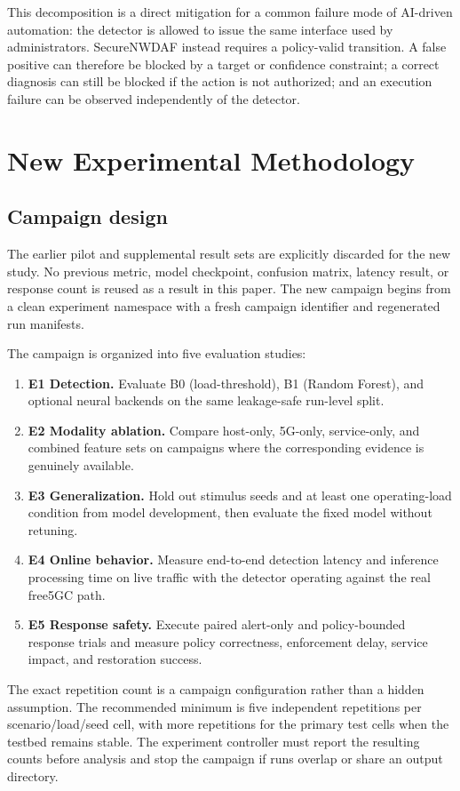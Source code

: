 \documentclass[sigconf,review]{acmart}
\begin{document}
This decomposition is a direct mitigation for a common failure mode of AI-driven automation: the detector is allowed to issue the same interface used by administrators. SecureNWDAF instead requires a policy-valid transition. A false positive can therefore be blocked by a target or confidence constraint; a correct diagnosis can still be blocked if the action is not authorized; and an execution failure can be observed independently of the detector.

\section{New Experimental Methodology}
\subsection{Campaign design}
The earlier pilot and supplemental result sets are explicitly discarded for the new study. No previous metric, model checkpoint, confusion matrix, latency result, or response count is reused as a result in this paper. The new campaign begins from a clean experiment namespace with a fresh campaign identifier and regenerated run manifests.

The campaign is organized into five evaluation studies:
\begin{enumerate}[leftmargin=*]
\item \textbf{E1 Detection.} Evaluate B0 (load-threshold), B1 (Random Forest), and optional neural backends on the same leakage-safe run-level split.
\item \textbf{E2 Modality ablation.} Compare host-only, 5G-only, service-only, and combined feature sets on campaigns where the corresponding evidence is genuinely available.
\item \textbf{E3 Generalization.} Hold out stimulus seeds and at least one operating-load condition from model development, then evaluate the fixed model without retuning.
\item \textbf{E4 Online behavior.} Measure end-to-end detection latency and inference processing time on live traffic with the detector operating against the real free5GC path.
\item \textbf{E5 Response safety.} Execute paired alert-only and policy-bounded response trials and measure policy correctness, enforcement delay, service impact, and restoration success.
\end{enumerate}

The exact repetition count is a campaign configuration rather than a hidden assumption. The recommended minimum is five independent repetitions per scenario/load/seed cell, with more repetitions for the primary test cells when the testbed remains stable. The experiment controller must report the resulting counts before analysis and stop the campaign if runs overlap or share an output directory.
\end{document}
